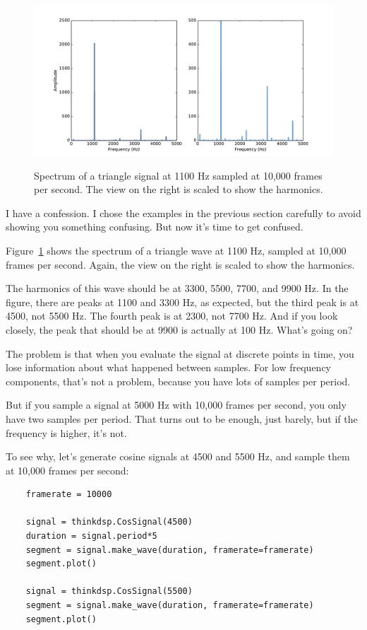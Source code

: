 \documentclass[12pt]{book}
\begin{document}
\begin{figure}
\centerline{\includegraphics[height=2.5in]{figs/triangle-1100-2.pdf}}
\caption{Spectrum of a triangle signal at 1100 Hz sampled at
10,000 frames per second.  The view on the right is scaled to
show the harmonics.}
\label{fig.triangle.1100.2}
\end{figure}

I have a confession.  I chose the examples in the previous section
carefully to avoid showing you something confusing.  But now it's
time to get confused.

Figure~\ref{fig.triangle.1100.2} shows the spectrum of a triangle wave
at 1100 Hz, sampled at 10,000 frames per second.  Again, the view on
the right is scaled to show the harmonics.

The harmonics
of this wave should be at 3300, 5500, 7700, and 9900 Hz.
In the figure, there are peaks at 1100 and 3300 Hz, as expected, but
the third peak is at 4500, not 5500 Hz.  The
fourth peak is at 2300, not 7700 Hz.  And if you look closely, the
peak that should be at 9900 is actually at 100 Hz.  What's going on?

The problem is that when you evaluate the signal at
discrete points in time, you lose information about what happened
between samples.  For low frequency components, that's not a
problem, because you have lots of samples per period.

But if you sample a signal at 5000 Hz with 10,000 frames per second,
you only have two samples per period.  That turns out to be enough,
just barely, but if the frequency is higher, it's not.

To see why, let's generate cosine signals at 4500 and 5500 Hz,
and sample them at 10,000 frames per second:

\begin{verbatim}
    framerate = 10000

    signal = thinkdsp.CosSignal(4500)
    duration = signal.period*5
    segment = signal.make_wave(duration, framerate=framerate)
    segment.plot()

    signal = thinkdsp.CosSignal(5500)
    segment = signal.make_wave(duration, framerate=framerate)
    segment.plot()
\end{verbatim}
\end{document}
